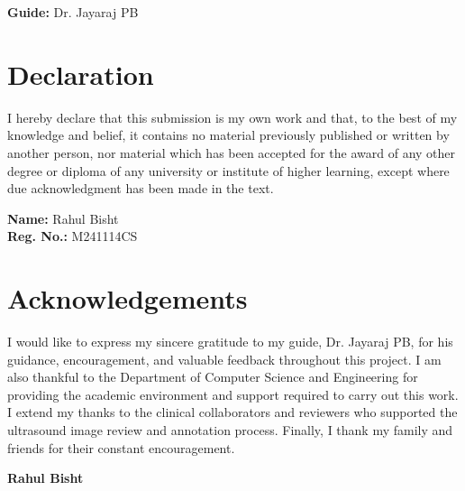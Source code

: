 ﻿\documentclass[12pt,a4paper]{report}
\begin{document}
\vspace{2cm}
\noindent\textbf{Guide:} Dr. Jayaraj PB

\chapter*{Declaration}
I hereby declare that this submission is my own work and that, to the best of my knowledge and belief, it contains no material previously published or written by another person, nor material which has been accepted for the award of any other degree or diploma of any university or institute of higher learning, except where due acknowledgment has been made in the text.

\vspace{2cm}
\noindent\textbf{Name:} Rahul Bisht\\
\textbf{Reg. No.:} M241114CS

\chapter*{Acknowledgements}
I would like to express my sincere gratitude to my guide, Dr. Jayaraj PB, for his guidance, encouragement, and valuable feedback throughout this project. I am also thankful to the Department of Computer Science and Engineering for providing the academic environment and support required to carry out this work. I extend my thanks to the clinical collaborators and reviewers who supported the ultrasound image review and annotation process. Finally, I thank my family and friends for their constant encouragement.

\vspace{1cm}
\begin{flushright}
\textbf{Rahul Bisht}
\end{flushright}
\end{document}
